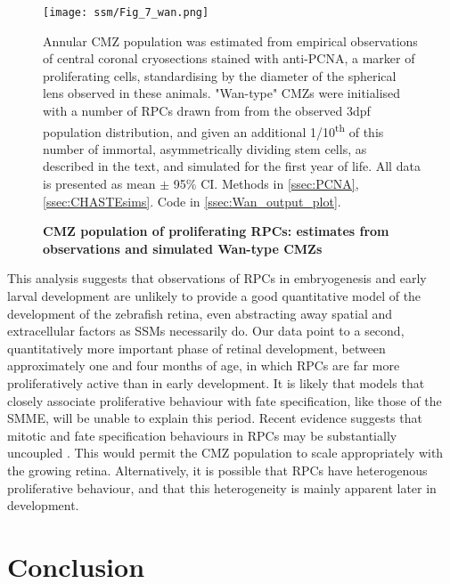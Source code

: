 \begin{figure}[!h]
\texttt{[image: ssm/Fig\_7\_wan.png]}   
\caption{{\bf CMZ population of proliferating RPCs: estimates from observations and simulated Wan-type CMZs}}
Annular CMZ population was estimated from empirical observations of central coronal cryosections stained with anti-PCNA, a marker of proliferating cells, standardising by the diameter of the spherical lens observed in these animals. "Wan-type" CMZs were initialised with a number of RPCs drawn from from the observed 3dpf population distribution, and given an additional 1/10\textsuperscript{th} of this number of immortal, asymmetrically dividing stem cells, as described in the text, and simulated for the first year of life. All data is presented as mean $\pm$ 95\% CI.
Methods in \autoref{ssec:PCNA}, \autoref{ssec:CHASTEsims}.
Code in \autoref{ssec:Wan_output_plot}.
\label{WanSim}
\end{figure}

This analysis suggests that observations of RPCs in embryogenesis and early larval development are unlikely to provide a good quantitative model of the development of the zebrafish retina, even abstracting away spatial and extracellular factors as SSMs necessarily do. Our data point to a second, quantitatively more important phase of retinal development, between approximately one and four months of age, in which RPCs are far more proliferatively active than in early development. It is likely that models that closely associate proliferative behaviour with fate specification, like those of the SMME, will be unable to explain this period. Recent evidence suggests that mitotic and fate specification behaviours in RPCs may be substantially uncoupled \cite{Engerer2017}. This would permit the CMZ population to scale appropriately with the growing retina. Alternatively, it is possible that RPCs have heterogenous proliferative behaviour, and that this heterogeneity is mainly apparent later in development.

\section{Conclusion}

